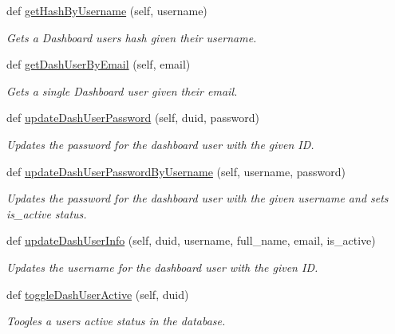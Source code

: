 \begin{DoxyCompactItemize}
def \hyperlink{classhandler_1_1dao_1_1user__dao_1_1_user_d_a_o_aa2275f3d06d7b6e83597600c1e6eccbd}{get\+Hash\+By\+Username} (self, username)
\begin{DoxyCompactList}\small\item\em Gets a Dashboard user\textquotesingle{}s hash given their username. \end{DoxyCompactList}\item 
def \hyperlink{classhandler_1_1dao_1_1user__dao_1_1_user_d_a_o_ad69106a48bfd2570d8f73797ba15a9f0}{get\+Dash\+User\+By\+Email} (self, email)
\begin{DoxyCompactList}\small\item\em Gets a single Dashboard user given their email. \end{DoxyCompactList}\item 
def \hyperlink{classhandler_1_1dao_1_1user__dao_1_1_user_d_a_o_a5cb109c59e12af858342091c0bff278b}{update\+Dash\+User\+Password} (self, duid, password)
\begin{DoxyCompactList}\small\item\em Updates the password for the dashboard user with the given ID. \end{DoxyCompactList}\item 
def \hyperlink{classhandler_1_1dao_1_1user__dao_1_1_user_d_a_o_a2defb0680d461acabaf05daf03214938}{update\+Dash\+User\+Password\+By\+Username} (self, username, password)
\begin{DoxyCompactList}\small\item\em Updates the password for the dashboard user with the given username and sets is\+\_\+active status. \end{DoxyCompactList}\item 
def \hyperlink{classhandler_1_1dao_1_1user__dao_1_1_user_d_a_o_aecd7d28a6180b613a29020d8a36aa49d}{update\+Dash\+User\+Info} (self, duid, username, full\+\_\+name, email, is\+\_\+active)
\begin{DoxyCompactList}\small\item\em Updates the username for the dashboard user with the given ID. \end{DoxyCompactList}\item 
def \hyperlink{classhandler_1_1dao_1_1user__dao_1_1_user_d_a_o_a7d3f0c6b17a15ea1bc3eb883d03ea0e8}{toggle\+Dash\+User\+Active} (self, duid)
\begin{DoxyCompactList}\small\item\em Toogles a user\textquotesingle{}s active status in the database. \end{DoxyCompactList}\item 

\end{DoxyCompactItemize}
